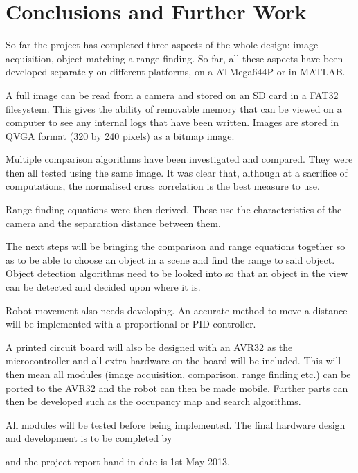 \chapter{Conclusions and Further Work} \label{Chapter: Conclusions}

So far the project has completed three aspects of the whole design: image acquisition, object matching a range finding. So far, all these aspects have been developed separately on different platforms, on a ATMega644P or in MATLAB. 

A full image can be read from a camera and stored on an SD card in a FAT32 filesystem. This gives the ability of removable memory that can be viewed on a computer to see any internal logs that have been written. Images are stored in QVGA format (320 by 240 pixels) as a bitmap image. 

Multiple comparison algorithms have been investigated and compared. They were then all tested using the same image. It was clear that, although at a sacrifice of computations, the normalised cross correlation is the best measure to use.

Range finding equations were then derived. These use the characteristics of the camera and the separation distance between them. 

The next steps will be bringing the comparison and range equations together so as to be able to choose an object in a scene and find the range to said object. Object detection algorithms need to be looked into so that an object in the view can be detected and decided upon where it is. 

Robot movement also needs developing. An accurate method to move a distance will be implemented with a proportional or PID controller. 

A printed circuit board will also be designed with an AVR32 as the microcontroller and all extra hardware on the board will be included. This will then mean all modules (image acquisition, comparison, range finding etc.) can be ported to the AVR32 and the robot can then be made mobile. Further parts can then be developed such as the occupancy map and search algorithms. 

All modules will be tested before being implemented. The final hardware design and development is to be completed by \date{15th March 2013} and the project report hand-in date is 1st May 2013. 